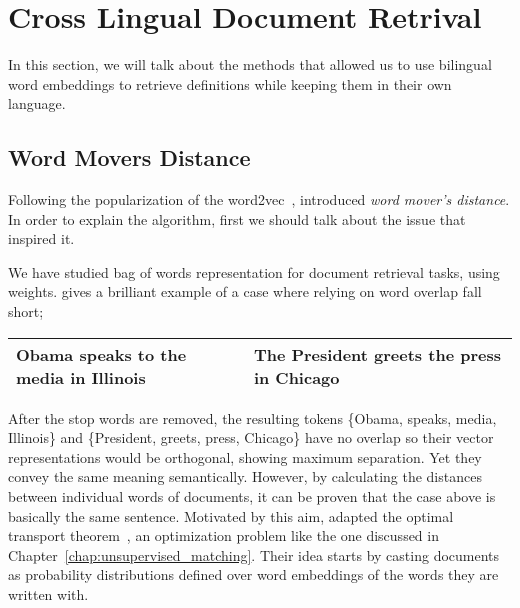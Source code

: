 \section{Cross Lingual Document Retrival}%
\label{sec:cross_lingual_document_retrival}

In this section, we will talk about the methods that allowed us to use bilingual word embeddings to retrieve definitions while keeping them in their own language.

\subsection{Word Movers Distance}%
\label{sub:word_movers_distance}

Following the popularization of the word2vec~\cite{mikolov_distributed_2013}, \textcite{kusner_word_2015} introduced \emph{word mover's distance}.
In order to explain the algorithm, first we should talk about the issue that inspired it.

We have studied bag of words representation for document retrieval tasks, using \tfidf{} weights.
\citeauthor{kusner_word_2015} gives a brilliant example of a case where relying on word overlap fall short;

\begin{tabular}{l l}
    \midrule
    Obama speaks to the media in Illinois & The President greets the press in Chicago \\
    \midrule
\end{tabular}

After the stop words are removed, the resulting tokens \{Obama, speaks, media, Illinois\} and \{President, greets, press, Chicago\} have no overlap so their vector representations would be orthogonal, showing maximum separation.
Yet they convey the same meaning semantically.
However, by calculating the distances between individual words of documents, it can be proven that the case above is basically the same sentence.
Motivated by this aim, \citeauthor{kusner_word_2015} adapted the optimal transport theorem~\cite{kantorovitch_translocation_1958}, an optimization problem like the one discussed in Chapter~\ref{chap:unsupervised_matching}.
Their idea starts by casting documents as probability distributions defined over word embeddings of the words they are written with.


